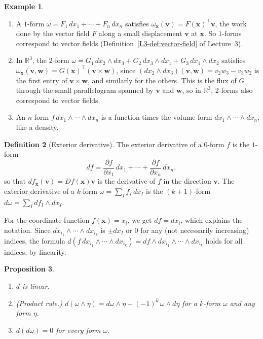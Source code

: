 \documentclass[11pt]{article}
\theoremstyle{definition}
\newtheorem{definition}{Definition}[section]
\newtheorem{example}[definition]{Example}
\theoremstyle{plain}
\newtheorem{proposition}[definition]{Proposition}
\theoremstyle{remark}
\begin{document}
\begin{example}\label{ex:forms}
    \begin{enumerate}
        \item A $1$-form $\omega = F_1\, dx_1 + \cdots + F_n\, dx_n$ satisfies $\omega_{\mathbf{x}}(\mathbf{v}) = F(\mathbf{x})^\top\mathbf{v}$, the work done by the vector field $F$ along a small displacement $\mathbf{v}$ at $\mathbf{x}$. So $1$-forms correspond to vector fields (Definition~\ref{L3-def:vector-field} of Lecture~3).
        \item In $\mathbb{R}^3$, the $2$-form $\omega = G_1\, dx_2 \wedge dx_3 + G_2\, dx_3 \wedge dx_1 + G_3\, dx_1 \wedge dx_2$ satisfies $\omega_{\mathbf{x}}(\mathbf{v}, \mathbf{w}) = G(\mathbf{x})^\top(\mathbf{v} \times \mathbf{w})$, since $(dx_2 \wedge dx_3)(\mathbf{v}, \mathbf{w}) = v_2w_3 - v_3w_2$ is the first entry of $\mathbf{v} \times \mathbf{w}$, and similarly for the others. This is the flux of $G$ through the small parallelogram spanned by $\mathbf{v}$ and $\mathbf{w}$, so in $\mathbb{R}^3$, $2$-forms also correspond to vector fields.
        \item An $n$-form $f\, dx_1 \wedge \cdots \wedge dx_n$ is a function times the volume form $dx_1 \wedge \cdots \wedge dx_n$, like a density.
    \end{enumerate}
\end{example}

\begin{definition}[Exterior derivative]\label{def:exterior-derivative}
    The exterior derivative of a $0$-form $f$ is the $1$-form
    \[df = \frac{\partial f}{\partial x_1}\, dx_1 + \cdots + \frac{\partial f}{\partial x_n}\, dx_n,\]
    so that $df_{\mathbf{x}}(\mathbf{v}) = Df(\mathbf{x})\mathbf{v}$ is the derivative of $f$ in the direction $\mathbf{v}$. The exterior derivative of a $k$-form $\omega = \sum_I f_I\, dx_I$ is the $(k + 1)$-form $d\omega = \sum_I df_I \wedge dx_I$.
\end{definition}

For the coordinate function $f(\mathbf{x}) = x_i$, we get $df = dx_i$, which explains the notation. Since $dx_{i_1} \wedge \cdots \wedge dx_{i_k}$ is $\pm dx_I$ or $0$ for any (not necessarily increasing) indices, the formula $d(f\, dx_{i_1} \wedge \cdots \wedge dx_{i_k}) = df \wedge dx_{i_1} \wedge \cdots \wedge dx_{i_k}$ holds for all indices, by linearity.

\begin{proposition}\label{prop:d-properties}
    \begin{enumerate}
        \item $d$ is linear.
        \item (Product rule.) $d(\omega \wedge \eta) = d\omega \wedge \eta + (-1)^k\, \omega \wedge d\eta$ for a $k$-form $\omega$ and any form $\eta$.
        \item $d(d\omega) = 0$ for every form $\omega$.
    \end{enumerate}
\end{proposition}
\end{document}
